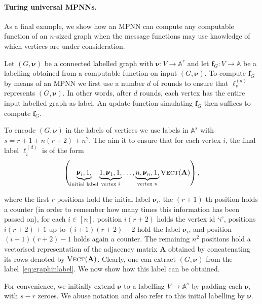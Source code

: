 \paragraph{Turing universal MPNNs.}
 As a final example, we show how an MPNN can compute any computable function
 of an $n$-sized graph when the message functions may use knowledge of which
 vertices are under consideration. 
\begin{example}
	Let $( G,\pmb{\nu})$ be a connected labelled graph with $\pmb{\nu}:V\to\mathbb{A}^r$ and let $\mathbf{f}_G:V\to\mathbb{A}$ be a labelling 
  obtained from a computable function on input $(G,\pmb{\nu})$. To compute
  $\mathbf{f}_G$ by means of an MPNN we first use a number $d$ of rounds to
  ensure that $\pmb{\ell}^{(d)}_v$ represents $( G,\pmb{\nu})$. In other
  words, after $d$ rounds, each vertex has the entire input labelled graph as
  label. An update function simulating $\mathbf{f}_G$ then suffices to compute
  $\mathbf{f}_G$.
	
To encode $( G,\pmb{\nu})$ in the labels of vertices we use labels in $\mathbb{A}^s$ with 
$s=r+1+n(r+2)+n^2$. The aim it to ensure that for each vertex $i$, the final label $\pmb{\ell}_i^{(d)}$ is of the form
\begin{equation}
\left(\underbrace{\pmb{\nu}_i,1,}_{\text{initial label}}\underbrace{1,\pmb{\nu}_1,1,}_{\text{vertex $i$}}\ldots,\underbrace{n,\pmb{\nu}_n,1,}_{\text{vertex $n$}}\textsc{Vect}(\mathbf{A})\right), \label{eq:graphinlabel}
\end{equation}

where the first $r$ positions hold the initial label $\pmb{\nu}_i$,
the $(r+1)$-th position holds a counter (in order to remember how many times
this information has been passed on), for each $i\in[n]$, position
$i(r+2)$ holds the vertex id `$i$', positions $i(r+2)+1$ up to $(i+1)(r+2)-2$
hold the label $\pmb{\nu}_i$, and position $(i+1)(r+2)-1$ holds again a counter.
The remaining $n^2$ positions hold a vectorised representation of the adjacency matrix $\mathbf{A}$ obtained by concatenating its rows denoted by $\textsc{Vect}(\mathbf{A})$. Clearly, one can extract 
$(G,\pmb{\nu})$ from the label~\eqref{eq:graphinlabel}. We now show how this label can be obtained.

For convenience, we initially extend $\pmb{\nu}$
to a labelling $V\to\mathbb{A}^s$ by padding each $\pmb{\nu}_i$ with $s-r$ zeroes. We abuse notation and also refer to this initial labelling by $\pmb{\nu}$.


\end{example}

